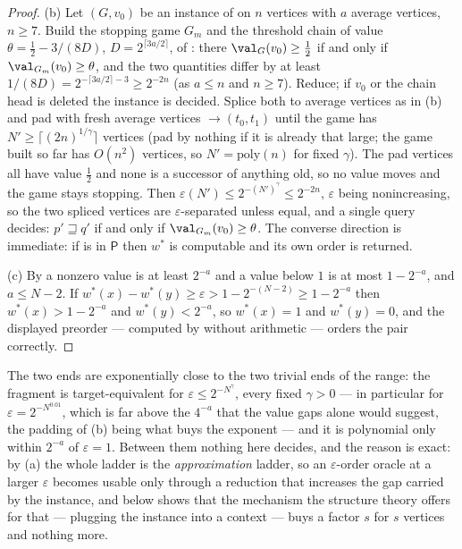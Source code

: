\begin{proof}
(b) Let $(G,v_0)$ be an instance of  on $n$ vertices with $a$
average vertices, $n\ge7$. Build the stopping game $G_m$ and the threshold
chain of value $\theta=\tfrac12-3/(8D)$, $D=2^{\lceil3a/2\rceil}$, of
: there $\val_G(v_0)\ge\tfrac12$ if and only if
$\val_{G_m}(v_0)\ge\theta$, and the two quantities differ by at least
$1/(8D)=2^{-\lceil3a/2\rceil-3}\ge2^{-2n}$ (as $a\le n$ and $n\ge7$). Reduce; if $v_0$ or the chain head
is deleted the instance is decided. Splice both to average vertices as in
(b) and pad with fresh average vertices $\to(t_0,t_1)$
until the game has $N'\ge\lceil(2n)^{1/\gamma}\rceil$ vertices (pad by nothing
if it is already that large; the game built so far has $O(n^{2})$ vertices, so
$N'=\mathrm{poly}(n)$ for fixed $\gamma$). The pad vertices all have value
$\tfrac12$ and none is a successor of anything old, so no value moves and the
game stays stopping. Then
$\varepsilon(N')\le2^{-(N')^{\gamma}}\le2^{-2n}$, $\varepsilon$ being
nonincreasing, so the two spliced vertices
are $\varepsilon$-separated unless equal, and a single query decides:
$p'\sqsupseteq q'$ if and only if $\val_{G_m}(v_0)\ge\theta$. The converse
direction is immediate: if  is in $\mathsf P$ then $w^\ast$ is
computable and its own order is returned.

(c) By  a nonzero value is at least $2^{-a}$ and a
value below $1$ is at most $1-2^{-a}$, and $a\le N-2$. If
$w^\ast(x)-w^\ast(y)\ge\varepsilon>1-2^{-(N-2)}\ge1-2^{-a}$ then $w^\ast(x)>1-2^{-a}$ and
$w^\ast(y)<2^{-a}$, so $w^\ast(x)=1$ and $w^\ast(y)=0$, and the displayed
preorder --- computed by  without arithmetic --- orders
the pair correctly.
\end{proof}

\begin{remark}\label{rem:wo-ladder}
The two ends are exponentially close to the two trivial ends of the range: the
fragment is target-equivalent for $\varepsilon\le2^{-N^{\gamma}}$, every fixed
$\gamma>0$ --- in particular for $\varepsilon=2^{-N^{0.01}}$, which is far
above the $4^{-a}$ that the value gaps alone would suggest, the padding of (b)
being what buys the exponent --- and it is polynomial only within $2^{-a}$ of
$\varepsilon=1$. Between them nothing here decides, and the reason is exact:
by (a) the whole ladder is the \emph{approximation} ladder, so an
$\varepsilon$-order oracle at a larger $\varepsilon$ becomes usable only
through a reduction that increases the gap carried by the instance, and
 below shows that the mechanism the structure
theory offers for that --- plugging the instance into a context --- buys a
factor $s$ for $s$ vertices and nothing more.
\end{remark}

